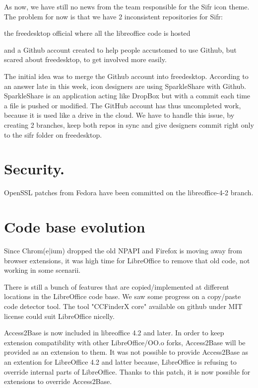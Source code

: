 \documentclass{article}
\begin{document}
As now, we have still no news from the team responsible for the Sifr icon theme. The problem for now is that we have 2 inconsistent repositories for Sifr:
\begin{listing}
\item the freedesktop official where all the libreoffice code is hosted
\item and a Github account created to help people accustomed to use Github, but scared about freedesktop, to get involved more easily.
\end{listing}

The initial idea was to merge the Github account into freedesktop. According to an answer late in this week\cite{sifrGithub1}, icon designers are using SparkleShare with Github. SparkleShare is an application acting like DropBox but with a commit each time a file is pushed or modified. The GitHub account has thus uncompleted work, because it is used like a drive in the cloud. We have to handle this issue, by creating 2 branches, keep both repos in sync and give designers commit right only to the sifr folder on freedesktop.

\section{Security.}

OpenSSL patches from Fedora have been committed on the libreoffice-4-2 branch.

\section{Code base evolution}

Since Chrom(e|ium) dropped the old NPAPI and Firefox is moving away from
browser extensions\cite{npapiMozilla}, it was high time for LibreOffice to remove that
old code, not working in some scenarii\cite{npapiLibONotWorking}.

There is still a bunch of features that are copied/implemented at
different locations in the LibreOffice code base. We saw some progress on a copy/paste code detector tool\cite{copyPasteDetectorBug}. The tool "CCFinderX core" available on github under MIT license could suit LibreOffice nicelly\cite{copyPasteDetectorGithub}.

Access2Base\cite{access2BaseDefinition} is now included in libreoffice 4.2 and later. In order to keep extension compatibility with other LibreOffice/OO.o forks, Access2Base will be provided as an extension to them. It was not possible to provide Access2Base as an extention for LibreOffice 4.2 and latter because, LibreOffice is refusing to override internal parts of LibreOffice. Thanks to this patch\cite{access2BaseOverridePatch}, it is now possible for extensions to override Access2Base.
\end{document}
